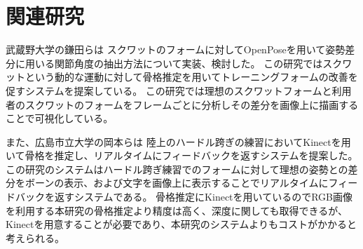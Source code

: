 \chapter{関連研究}
\label{related_reserch}

武蔵野大学の鎌田らは \cite{Relatedresearch1}スクワットのフォームに対してOpenPoseを用いて姿勢差分に用いる関節角度の抽出方法について実装、検討した。
この研究ではスクワットという動的な運動に対して骨格推定を用いてトレーニングフォームの改善を促すシステムを提案している。
この研究では理想のスクワットフォームと利用者のスクワットのフォームをフレームごとに分析しその差分を画像上に描画することで可視化している。

また、広島市立大学の岡本らは \cite{Relatedresearch2}陸上のハードル跨ぎの練習においてKinectを用いて骨格を推定し、リアルタイムにフィードバックを返すシステムを提案した。
この研究のシステムはハードル跨ぎ練習でのフォームに対して理想の姿勢との差分をボーンの表示、および文字を画像上に表示することでリアルタイムにフィードバックを返すシステムである。
骨格推定にKinectを用いているのでRGB画像を利用する本研究の骨格推定より精度は高く、深度に関しても取得できるが、Kinectを用意することが必要であり、本研究のシステムよりもコストがかかると考えられる。
